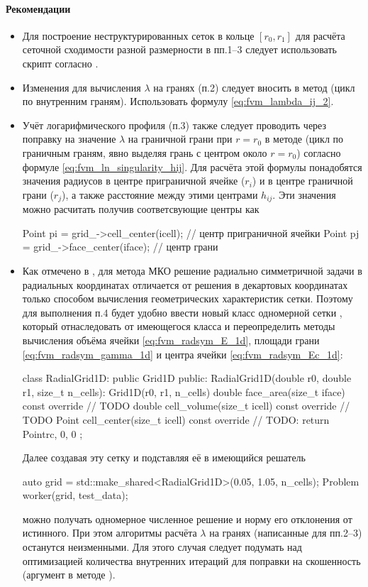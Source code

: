 \paragraph{Рекомендации}
\begin{itemize}
\item
Для построение неструктурированных сеток в кольце $[r_0, r_1]$ для расчёта сеточной сходимости разной размерности
в пп.1--3 следует использовать скрипт  согласно .

\item
Изменения для вычисления $\lambda$ на гранях (п.2) следует вносить в метод  (цикл по внутренним граням).
Использовать формулу \cref{eq:fvm_lambda_ij_2}.

\item
Учёт логарифмического профиля (п.3) также следует проводить через поправку на значение $\lambda$
на граничной грани при $r=r_0$ в методе  (цикл по граничным граням, явно выделяя грань с центром около $r=r_0$) согласно формуле \cref{eq:fvm_ln_singularity_hij}.
Для расчёта этой формулы понадобятся значения радиусов в центре приграничной ячейке ($r_i$) и  в центре граничной грани ($r_j$),
а также расстояние между этими центрами $h_{ij}$.
Эти значения можно расчитать получив соответсвующие центры как
\begin{cppcode}
Point pi = grid_->cell_center(icell);  // центр приграничной ячейки
Point pj = grid_->face_center(iface);  // центр грани
\end{cppcode}

\item 
Как отмечено в , для метода МКО решение радиально симметричной
задачи в радиальных координатах отличается от решения в декартовых координатах
только способом вычисления геометрических характеристик сетки.
Поэтому для выполнения п.4 будет удобно ввести новый класс одномерной сетки ,
который отнаследовать от имеющегося класса  и переопределить
методы вычисления объёма ячейки \cref{eq:fvm_radsym_E_1d}, площади грани \cref{eq:fvm_radsym_gamma_1d} и центра ячейки \cref{eq:fvm_radsym_Ec_1d}:
\begin{cppcode}
class RadialGrid1D: public Grid1D{
public:
    RadialGrid1D(double r0, double r1, size_t n_cells): Grid1D(r0, r1, n_cells){}
    double face_area(size_t iface) const override {
        // TODO
    }
    double cell_volume(size_t icell) const override {
        // TODO
    }
    Point cell_center(size_t icell) const override {
        // TODO: return Point{rc, 0, 0}
    }
};
\end{cppcode}
Далее создавая эту сетку и подставляя её в имеющийся решатель
\begin{cppcode}
auto grid = std::make_shared<RadialGrid1D>(0.05, 1.05, n_cells);
Problem worker(grid, test_data);
\end{cppcode}
можно получать одномерное численное решение и норму его отклонения от истинного.
При этом алгоритмы расчёта $\lambda$ на гранях (написанные для пп.2--3) останутся неизменными.
Для этого случая следует подумать над оптимизацией количества внутренних итераций для поправки на скошенность
(аргумент  в методе ).


\end{itemize}
